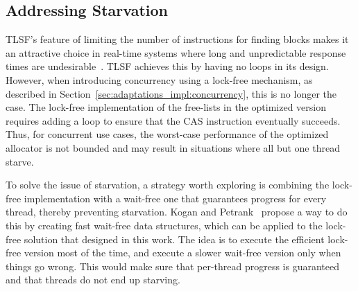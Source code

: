 \subsection{Addressing Starvation}
\label{sec:future-work:starvation}

TLSF's feature of limiting the number of instructions for finding blocks makes it an attractive choice in real-time systems where long and unpredictable response times are undesirable~\cite{TLSF}. TLSF achieves this by having no loops in its design. However, when introducing concurrency using a lock-free mechanism, as described in Section~\ref{sec:adaptations_impl:concurrency}, this is no longer the case. The lock-free implementation of the free-lists in the optimized version requires adding a loop to ensure that the CAS instruction eventually succeeds. Thus, for concurrent use cases, the worst-case performance of the optimized allocator is not bounded and may result in situations where all but one thread starve. 

To solve the issue of starvation, a strategy worth exploring is combining the lock-free implementation with a wait-free one that guarantees progress for every thread, thereby preventing starvation. Kogan and Petrank~\cite{fast_wait_free} propose a way to do this by creating fast wait-free data structures, which can be applied to the lock-free solution that designed in this work. The idea is to execute the efficient lock-free version most of the time, and execute a slower wait-free version only when things go wrong. This would make sure that per-thread progress is guaranteed and that threads do not end up starving.

